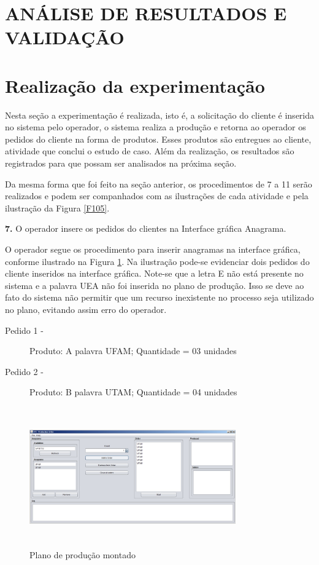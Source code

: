 \documentclass[10pt,letterpaper,twocolumn]{IEEEtran}
\begin{document}


\section{ANÁLISE DE RESULTADOS E VALIDAÇÃO}


	\section{Realização da experimentação}
	
	
	Nesta seção a experimentação é realizada, isto é, a solicitação do cliente é inserida no sistema pelo operador, 
	o sistema realiza a produção e retorna ao operador os pedidos do cliente na forma de produtos. Esses produtos 
	são entregues ao cliente, atividade que conclui o estudo de caso. Além da realização, os resultados são 
	registrados para que possam ser analisados na próxima seção. \par 
	
	Da mesma forma que foi feito na seção anterior, os procedimentos de 7 a 11 serão realizados e podem ser 
	companhados com as ilustrações de cada atividade e pela ilustração da Figura \ref{F105}.
	
	\textbf{7.} O operador insere os pedidos do clientes na Interface gráfica Anagrama.
	
	O operador segue os procedimento para inserir anagramas na interface gráfica, conforme ilustrado na 
	Figura \ref{F142}. Na ilustração pode-se evidenciar dois pedidos do cliente inseridos na interface 
	gráfica. Note-se que a letra E não está presente no sistema e a palavra UEA não foi inserida no plano 
	de produção. Isso se deve ao fato do sistema não permitir que um recurso inexistente no processo seja 
	utilizado no plano, evitando assim erro do operador.
	\begin{description}
		\item[Pedido 1 -] Produto: A  palavra UFAM; Quantidade = 03 unidades
		\item[Pedido 2 -] Produto: B  palavra UTAM; Quantidade = 04 unidades
	\end{description} 
	
	\begin{figure}[!h]
		\centering
		\includegraphics[width=8.9cm, height=6cm]{MeDSE_imagens/F142_PLANO1.jpg} 
		\caption{Plano de produção montado}
		\label{F142}
	\end{figure}
	
\end{document}

